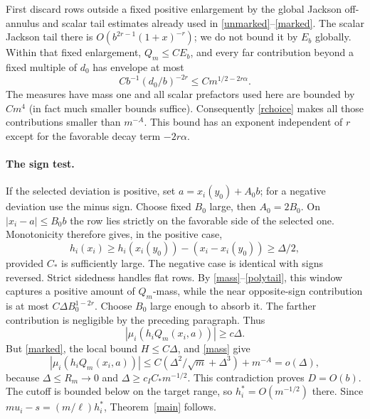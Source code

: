 \documentclass[11pt]{article}
\begin{document}
First discard rows outside a fixed positive enlargement by the global
Jackson off-annulus and scalar tail estimates already used in
\eqref{unmarked}--\eqref{marked}. The scalar Jackson tail there is
$O(b^{2r-1}(1+x)^{-r})$; we do not bound it by $E_b$ globally.
Within that fixed enlargement, $Q_m\le CE_b$, and every far
contribution beyond a fixed multiple of $d_0$ has envelope
at most
\[
 C b^{-1}(d_0/b)^{-2r}\le C m^{1/2-2r\alpha}.
\]
The measures have mass one and all scalar prefactors used here are
bounded by $Cm^4$ (in fact much smaller bounds suffice).
Consequently \eqref{rchoice} makes all those contributions smaller
than $m^{-A}$. This bound has an exponent independent of $r$ except
for the favorable decay term $-2r\alpha$.

\paragraph{The sign test.}
If the selected deviation is positive, set
$a=x_i(y_0)+A_0b$; for a negative deviation use the minus sign.
Choose fixed $B_0$ large, then $A_0=2B_0$.
On $|x_i-a|\le B_0b$ the row lies strictly on the favorable side
of the selected one. Monotonicity therefore gives, in the positive
case,
\[
 h_i(x_i)\ge h_i(x_i(y_0))-(x_i-x_i(y_0))\ge\Delta/2,
\]
provided $C_*$ is sufficiently large. The negative case is identical
with signs reversed. Strict sidedness handles flat rows.
By \eqref{mass}--\eqref{polytail}, this window captures a positive
amount of $Q_m$-mass, while the near opposite-sign contribution is
at most $C\Delta B_0^{1-2r}$. Choose $B_0$ large enough to absorb it.
The farther contribution is negligible by the preceding paragraph.
Thus
\[
 |\mu_i(h_iQ_m(x_i,a))|\ge c\Delta.
\]
But \eqref{marked}, the local bound $H\le C\Delta$, and
\eqref{mass} give
\[
 |\mu_i(h_iQ_m(x_i,a))|
 \le C(\Delta^2/\sqrt m+\Delta^3)+m^{-A}=o(\Delta),
\]
because $\Delta\le R_m\to0$ and $\Delta\ge c_I C_*m^{-1/2}$.
This contradiction proves $D=O(b)$. The cutoff is bounded below
on the target range, so $h_i^*=O(m^{-1/2})$ there.
Since $m u_i-s=(m/\ell)h_i^*$, Theorem~\ref{main} follows.
\end{document}
